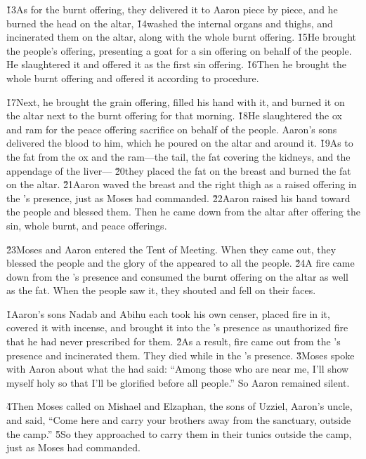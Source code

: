 \v{13}As for the burnt offering, they delivered it to Aaron piece by piece, and he burned the head on the altar, \v{14}washed the internal organs and thighs, and incinerated them on the altar, along with the whole burnt offering. \v{15}He brought the people's offering, presenting a goat for a sin offering on behalf of the people. He slaughtered it and offered it as the first sin offering. \v{16}Then he brought the whole burnt offering and offered it according to procedure.

\v{17}Next, he brought the grain offering, filled his hand with it, and burned it on the altar next to the burnt offering for that morning. \v{18}He slaughtered the ox and ram for the peace offering sacrifice on behalf of the people. Aaron's sons delivered the blood to him, which he poured on the altar and around it. \v{19}As to the fat from the ox and the ram---the tail, the fat covering the kidneys, and the appendage of the liver--- \v{20}they placed the fat on the breast and burned the fat on the altar. \v{21}Aaron waved the breast and the right thigh as a raised offering in the 's presence, just as Moses had commanded. \v{22}Aaron raised his hand toward the people and blessed them. Then he came down from the altar after offering the sin, whole burnt, and peace offerings.

\v{23}Moses and Aaron entered the Tent of Meeting. When they came out, they blessed the people and the glory of the  appeared to all the people. \v{24}A fire came down from the 's presence and consumed the burnt offering on the altar as well as the fat. When the people saw it, they shouted and fell on their faces.

\v{1}Aaron's sons Nadab and Abihu each took his own censer, placed fire in it, covered it with incense, and brought it into the 's presence as unauthorized fire that he had never prescribed for them. \v{2}As a result, fire came out from the 's presence and incinerated them. They died while in the 's presence. \v{3}Moses spoke with Aaron about what the  had said: ``Among those who are near me, I'll show myself holy so that I'll be glorified before all people.'' So Aaron remained silent.

\v{4}Then Moses called on Mishael and Elzaphan, the sons of Uzziel, Aaron's uncle, and said, ``Come here and carry your brothers away from the sanctuary, outside the camp.'' \v{5}So they approached to carry them in their tunics outside the camp, just as Moses had commanded.

